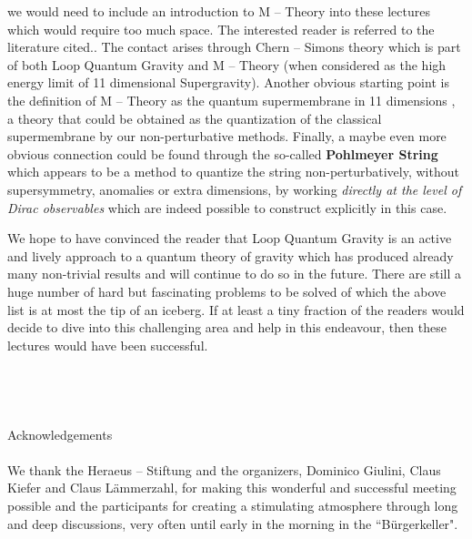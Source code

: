 \documentclass[12pt]{report}
\begin{document}
\begin{itemize}
{we would need to include an introduction to M -- Theory into these 
lectures which would require too much space. The interested reader 
is referred to the literature cited.}. The contact arises through
Chern -- Simons theory which is part of both Loop Quantum Gravity and 
M -- Theory \cite{71a} (when considered as the high energy limit of 
11 dimensional Supergravity). Another obvious starting point
is the definition of M -- Theory as the quantum supermembrane in 
11 dimensions \cite{72}, a theory that could be obtained as the 
quantization of the classical supermembrane by our non-perturbative 
methods. Finally, a maybe even more obvious connection could be found 
through the so-called 
{\bf Pohlmeyer String} \cite{73} which appears to be a method to quantize 
the string non-perturbatively, without supersymmetry, anomalies or 
extra dimensions, by working 
{\it directly at the level of Dirac observables} which are indeed 
possible to construct explicitly in this case.    
%
\end{itemize}
%
We hope to have convinced the reader that Loop Quantum Gravity 
is an active and lively approach to a quantum theory of gravity which 
has produced already many non-trivial results and will continue to do so 
in the future. There are still a huge number of hard but fascinating 
problems to be solved of which the above list is at most the tip of an 
iceberg. If at least a tiny fraction of the readers  
would decide to dive into this challenging area and help in this 
endeavour, then these lectures would have been successful.\\
\\
\\
\\
\\
{\large Acknowledgements}\\
\\
We thank the Heraeus -- Stiftung and the organizers, Dominico Giulini,
Claus Kiefer and Claus L\"ammerzahl, for making this wonderful and 
successful meeting possible and the participants for creating a 
stimulating atmosphere through long and deep discussions, very often 
until early in the morning in the ``B\"urgerkeller". 
\end{document}
